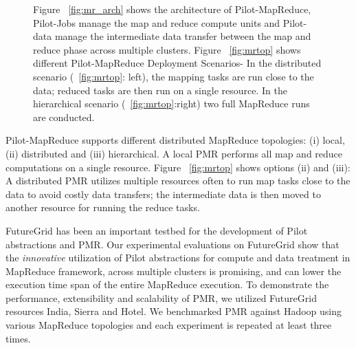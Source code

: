 \documentclass[]{paper}
\begin{document}
\begin{figure}[t]
	\caption{ Figure ~\ref{fig:mr_arch} shows the architecture of Pilot-MapReduce, Pilot-Jobs manage the map and reduce compute  units and Pilot-data manage the intermediate data transfer between the map and reduce phase across multiple clusters. Figure ~\ref{fig:mrtop} shows different Pilot-MapReduce Deployment Scenarios- In the distributed scenario (~\ref{fig:mrtop}: left), the mapping tasks are run close to the data; reduced tasks are then run on a single resource. In the hierarchical scenario (~\ref{fig:mrtop}:right) two full MapReduce runs are conducted.  }
	\label{fig:combo_2}

\end{figure}

Pilot-MapReduce supports different distributed MapReduce topologies: (i) local, (ii) distributed and (iii) hierarchical. A local PMR performs all map and reduce computations on a single resource. Figure ~\ref{fig:mrtop} shows options (ii) and (iii): A distributed PMR utilizes multiple resources often to run map tasks close to the data to avoid costly data transfers; the intermediate data is then moved to another resource for running the reduce tasks. ~\cite{pmr-2012}


FutureGrid has been an important testbed for the development of Pilot abstractions and PMR.
Our experimental evaluations on FutureGrid show that the \textit{innovative} utilization of Pilot abstractions for compute and data treatment in MapReduce framework, across multiple clusters is promising, and can lower the execution time span of the entire MapReduce execution. To demonstrate the performance, extensibility and scalability of PMR, we utilized FutureGrid resources India, Sierra and Hotel.  We benchmarked PMR against Hadoop using various MapReduce topologies and each experiment is repeated at least three times.
\end{document}
